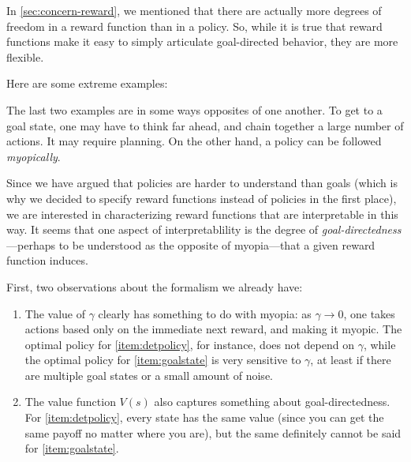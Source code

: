 \documentclass{article}
\begin{document}
    In \cref{sec:concern-reward}, we mentioned that there are actually more degrees of freedom in a reward function than in a policy.
    So, while it is true that reward functions make it easy to simply articulate goal-directed behavior, they are more flexible.

    Here are some extreme examples:


    The last two examples are in some ways opposites of one another. To get to a goal state, one may have to think far ahead, and chain together a large number of actions. It may require planning.
    On the other hand, a policy can be followed \emph{myopically}.

    Since we have argued that policies are harder to understand than goals (which is why we decided to specify reward functions instead of policies in the first place), we are interested in characterizing reward functions that are interpretable in this way.
    It seems that one aspect of interpretablility is the degree of \emph{goal-directedness}---perhaps to be understood as the opposite of myopia---that a given reward function induces.

    First, two observations about the formalism we already have:
    \begin{enumerate}
        \item The value of $\gamma$ clearly has something to do with myopia: as $\gamma \to 0$, one takes actions based only on the immediate next reward, and making it myopic. The optimal policy for \cref{item:detpolicy}, for instance, does not depend on $\gamma$, while the optimal policy for \cref{item:goalstate} is very sensitive to $\gamma$, at least if there are multiple goal states or a small amount of noise.
        \item The value function $V(s)$ also captures something about goal-directedness. For \cref{item:detpolicy}, every state has the same value (since you can get the same payoff no matter where you are), but the same definitely cannot be said for \cref{item:goalstate}.
    \end{enumerate}
\end{document}
